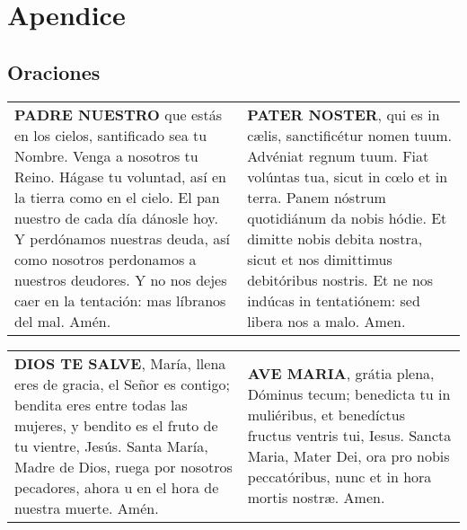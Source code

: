 \documentclass[./rosary.tex]{subfiles}
\begin{document}
\section*{Apendice}

\subsection*{Oraciones}

\label{sec:ourFather}
\begin{longtable} { p{} p{} }
    \textbf{PADRE NUESTRO} que estás en los cielos, santificado sea tu Nombre. Venga a nosotros tu Reino.
    Hágase tu voluntad, así en la tierra como en el cielo. El pan nuestro de cada día dánosle hoy.
    Y perdónamos nuestras deuda, así como nosotros perdonamos a nuestros deudores.
    Y no nos dejes caer en la tentación: mas líbranos del mal. Amén.

     &

    \textbf{PATER NOSTER}, qui es in cælis, sanctificétur nomen tuum. Advéniat regnum tuum.
    Fiat volúntas tua, sicut in cœlo et in terra. Panem nóstrum quotidiánum da nobis hódie.
    Et dimitte nobis debita nostra, sicut et nos dimittimus debitóribus nostris.
    Et ne nos indúcas in tentatiónem: sed libera nos a malo. Amen.
\end{longtable}

\label{sec:hailMary}
\begin{longtable} { p{} p{} }
    \textbf{DIOS TE SALVE}, María, llena eres de gracia, el Señor es contigo; bendita eres entre todas las mujeres,
    y bendito es el fruto de tu vientre, Jesús. Santa María, Madre de Dios, ruega por nosotros pecadores,
    ahora u en el hora de nuestra muerte. Amén.

     &

    \textbf{AVE MARIA}, grátia plena, Dóminus tecum; benedicta tu in muliéribus, et benedíctus fructus ventris tui,
    Iesus. Sancta Maria, Mater Dei, ora pro nobis peccatóribus, nunc et in hora mortis nostræ. Amen.
\end{longtable}
\end{document}
